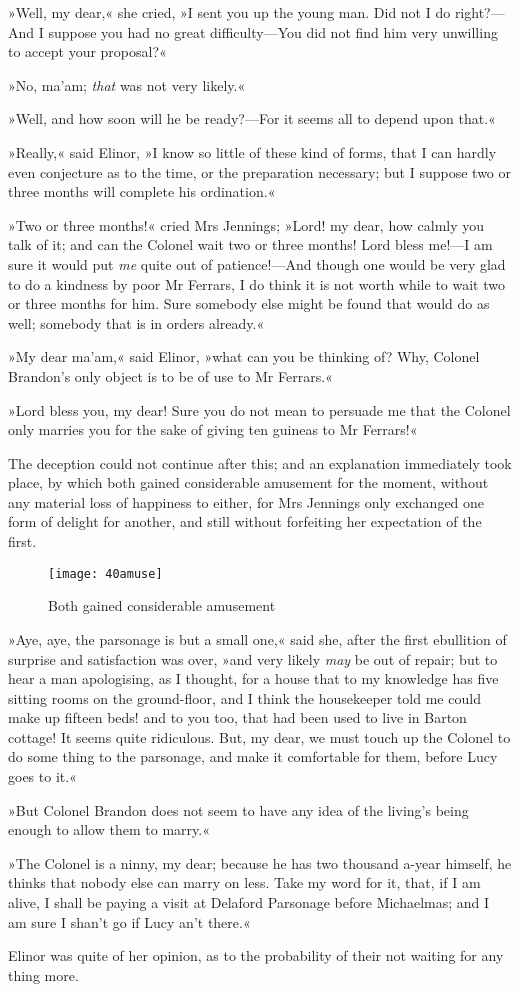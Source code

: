 »Well, my dear,« she cried, »I sent you up the young man. Did not I do right?—And I suppose you had no great difficulty—You did not find him very unwilling to accept your proposal?«

»No, ma’am; \textit{that} was not very likely.«

»Well, and how soon will he be ready?—For it seems all to depend upon that.«

»Really,« said Elinor, »I know so little of these kind of forms, that I can hardly even conjecture as to the time, or the preparation necessary; but I suppose two or three months will complete his ordination.«

»Two or three months!« cried Mrs Jennings; »Lord! my dear, how calmly you talk of it; and can the Colonel wait two or three months! Lord bless me!—I am sure it would put \textit{me} quite out of patience!—And though one would be very glad to do a kindness by poor Mr Ferrars, I do think it is not worth while to wait two or three months for him. Sure somebody else might be found that would do as well; somebody that is in orders already.«

»My dear ma’am,« said Elinor, »what can you be thinking of? Why, Colonel Brandon’s only object is to be of use to Mr Ferrars.«

»Lord bless you, my dear! Sure you do not mean to persuade me that the Colonel only marries you for the sake of giving ten guineas to Mr Ferrars!«

The deception could not continue after this; and an explanation immediately took place, by which both gained considerable amusement for the moment, without any material loss of happiness to either, for Mrs Jennings only exchanged one form of delight for another, and still without forfeiting her expectation of the first.

\begin{figure}[tbph]
\centering
\texttt{[image: 40amuse]}
\caption{Both gained considerable amusement}
\end{figure}

»Aye, aye, the parsonage is but a small one,« said she, after the first ebullition of surprise and satisfaction was over, »and very likely \textit{may} be out of repair; but to hear a man apologising, as I thought, for a house that to my knowledge has five sitting rooms on the ground-floor, and I think the housekeeper told me could make up fifteen beds! and to you too, that had been used to live in Barton cottage! It seems quite ridiculous. But, my dear, we must touch up the Colonel to do some thing to the parsonage, and make it comfortable for them, before Lucy goes to it.«

»But Colonel Brandon does not seem to have any idea of the living’s being enough to allow them to marry.«

»The Colonel is a ninny, my dear; because he has two thousand a-year himself, he thinks that nobody else can marry on less. Take my word for it, that, if I am alive, I shall be paying a visit at Delaford Parsonage before Michaelmas; and I am sure I shan’t go if Lucy an’t there.«

Elinor was quite of her opinion, as to the probability of their not waiting for any thing more.